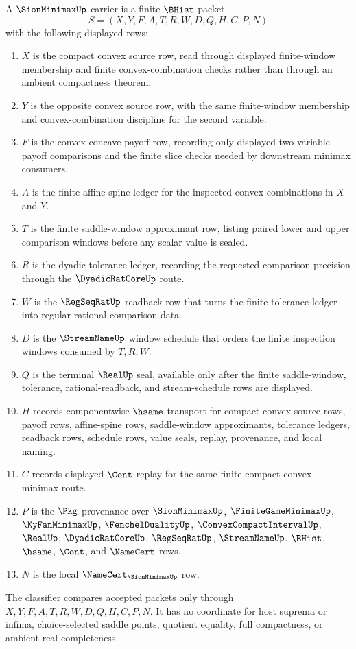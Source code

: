 \begin{definition}
\label{def:sion-minimax-carrier}
A $\SionMinimaxUp$ carrier is a finite $\BHist$ packet
$$
S=(X,Y,F,A,T,R,W,D,Q,H,C,P,N)
$$
with the following displayed rows:
\begin{enumerate}
\item $X$ is the compact convex source row, read through displayed
finite-window membership and finite convex-combination checks rather than
through an ambient compactness theorem.
\item $Y$ is the opposite convex source row, with the same finite-window
membership and convex-combination discipline for the second variable.
\item $F$ is the convex-concave payoff row, recording only displayed
two-variable payoff comparisons and the finite slice checks needed by
downstream minimax consumers.
\item $A$ is the finite affine-spine ledger for the inspected convex
combinations in $X$ and $Y$.
\item $T$ is the finite saddle-window approximant row, listing paired lower
and upper comparison windows before any scalar value is sealed.
\item $R$ is the dyadic tolerance ledger, recording the requested comparison
precision through the $\DyadicRatCoreUp$ route.
\item $W$ is the $\RegSeqRatUp$ readback row that turns the finite tolerance
ledger into regular rational comparison data.
\item $D$ is the $\StreamNameUp$ window schedule that orders the finite
inspection windows consumed by $T,R,W$.
\item $Q$ is the terminal $\RealUp$ seal, available only after the finite
saddle-window, tolerance, rational-readback, and stream-schedule rows are
displayed.
\item $H$ records componentwise $\hsame$ transport for compact-convex source
rows, payoff rows, affine-spine rows, saddle-window approximants, tolerance
ledgers, readback rows, schedule rows, value seals, replay, provenance, and
local naming.
\item $C$ records displayed $\Cont$ replay for the same finite compact-convex
minimax route.
\item $P$ is the $\Pkg$ provenance over $\SionMinimaxUp$,
$\FiniteGameMinimaxUp$, $\KyFanMinimaxUp$, $\FenchelDualityUp$,
$\ConvexCompactIntervalUp$, $\RealUp$, $\DyadicRatCoreUp$, $\RegSeqRatUp$,
$\StreamNameUp$, $\BHist$, $\hsame$, $\Cont$, and $\NameCert$ rows.
\item $N$ is the local $\NameCert_{\SionMinimaxUp}$ row.
\end{enumerate}
The classifier compares accepted packets only through
$X,Y,F,A,T,R,W,D,Q,H,C,P,N$. It has no coordinate for host suprema or infima,
choice-selected saddle points, quotient equality, full compactness, or ambient
real completeness.
\end{definition}

